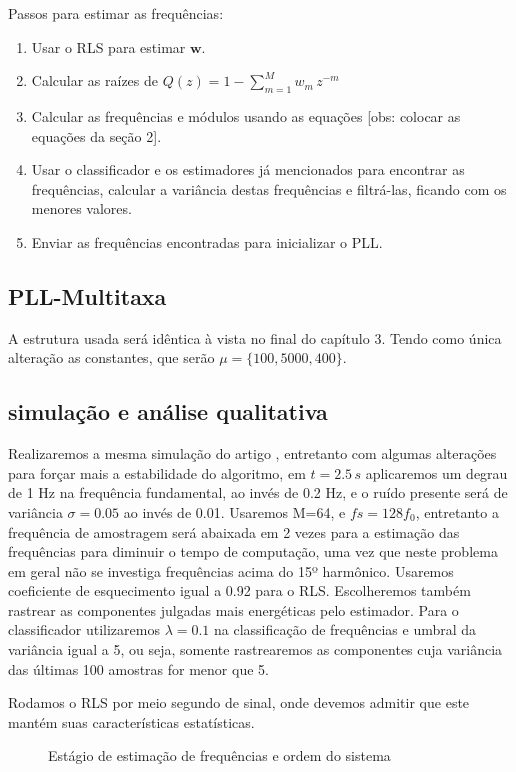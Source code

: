 Passos para estimar as frequências:

\begin{enumerate}
	\item Usar o RLS para estimar $\boldsymbol{w}$.
	\item Calcular as raízes de $Q(z)=1-\sum_{m=1}^{M}w_m \, z^{-m}$
	\item Calcular as frequências e módulos usando as equações [obs: colocar as equações da seção 2].
	\item Usar o classificador e os estimadores já mencionados para encontrar as frequências, calcular a variância destas frequências e filtrá-las, ficando com os menores valores.
	\item Enviar as frequências encontradas para inicializar o PLL.  
\end{enumerate}
	
\subsection{PLL-Multitaxa}
A estrutura usada será idêntica à vista no final do capítulo 3. Tendo como única alteração as constantes, que serão $\mu=\{100, 5000, 400\}$.

\subsection{simulação e análise qualitativa}
Realizaremos a mesma simulação do artigo \cite{chang2009two}, entretanto com algumas alterações para forçar mais a estabilidade do algoritmo, em $t=2.5 \, s$ aplicaremos um degrau de 1 Hz na frequência fundamental, ao invés de 0.2 Hz, e o ruído presente será de variância $\sigma=0.05$ ao invés de 0.01. Usaremos M=64, e $fs=128f_0$, entretanto a frequência de amostragem será abaixada em 2 vezes para a estimação das frequências para diminuir o tempo de computação, uma vez que neste problema em geral não se investiga frequências acima do 15º harmônico. Usaremos coeficiente de esquecimento igual a 0.92 para o RLS. Escolheremos também rastrear as componentes julgadas mais energéticas pelo estimador. Para o classificador utilizaremos $\lambda=0.1$ na classificação de frequências e umbral da variância igual a 5, ou seja, somente rastrearemos as componentes cuja variância das últimas 100 amostras for menor que 5. 

Rodamos o RLS por meio segundo de sinal, onde devemos admitir que este mantém suas características estatísticas.

\begin{figure}[H]
	\centering    
	\def\svgwidth{\columnwidth}
	
	\caption{Estágio de estimação de frequências e ordem do sistema}
	\label{fig:estagio_1}
\end{figure}

